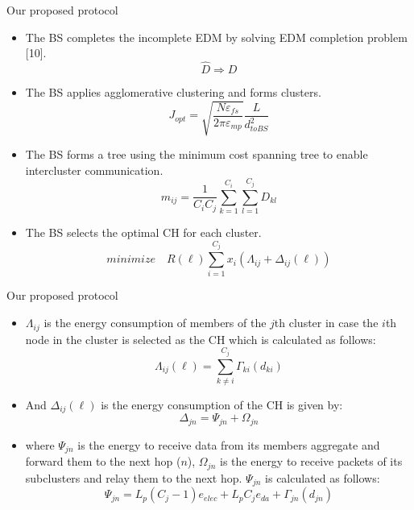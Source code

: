 \documentclass{beamer}
\begin{document}
\begin{frame}[t]{Our proposed protocol} %
\begin{itemize}
\justifying
\small
\item The BS completes the incomplete EDM by solving EDM completion problem [10].
\begin{equation}
\hat{D} \Longrightarrow  D
\end{equation}
\item The BS applies agglomerative clustering and forms clusters.
\begin{equation}
J_{opt}=\sqrt{\frac{N \varepsilon_{fs}}{2\pi \varepsilon_{mp}}}\frac{L}{d_{toBS}^{2}}
\end{equation}
\item The BS forms a tree using the minimum cost spanning tree to enable intercluster communication.
\begin{equation}
m_{ij}=\frac{1}{C_i C_j}\sum_{k=1}^{C_i}\sum_{l=1}^{C_j}D_{kl}
\end{equation}
\item The BS selects the optimal CH for each cluster.
\begin{equation}
minimize\quad R(\ell)\sum_{i=1}^{C_{j}}x_i(\Lambda_{ij}+\Delta_{ij}(\ell))
\end{equation}
\end{itemize}

\end{frame}

\begin{frame}[t]{Our proposed protocol} %
\begin{itemize}
\small
\justifying
\item $\Lambda_{ij}$ is the energy consumption of members of the $j$th cluster in case the $i$th node in the cluster is selected as the CH which is calculated as follows:
\begin{equation}
\Lambda_{ij}(\ell)=\sum_{k\neq i}^{C_j} \Gamma_{ki}(d_{ki})
\end{equation}
\item And $\Delta_{ij}(\ell)$ is the energy consumption of the CH is given by:
\begin{equation}
\Delta_{jn}= \Psi_{jn}+ \Omega_{jn}
\end{equation}
\item where $\Psi_{jn}$ is the energy to receive data from its members aggregate and forward them to the next hop ($n$), $\Omega_{jn}$ is the energy to receive packets of its subclusters and relay them to the next hop. $\Psi_{jn}$ is calculated as follows:
\begin{equation}
\Psi_{jn}=L_p(C_j-1)e_{elec}+L_pC_je_{da}+\Gamma_{jn}(d_{jn})
\end{equation}
\end{itemize}
\end{frame}
\end{document}
